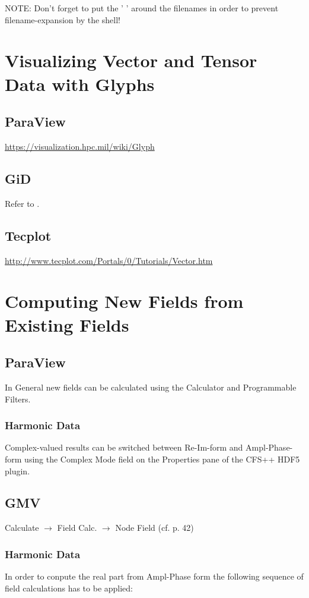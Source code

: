 NOTE: Don't  forget to put the  ' ' around  the filenames in order  to prevent
filename-expansion by the shell!


\section{Visualizing Vector and Tensor Data with Glyphs}

\subsection{ParaView}
\url{https://visualization.hpc.mil/wiki/Glyph}

\subsection{GiD}
Refer   to   \cite{Simkovics2010}.

\subsection{Tecplot}
\url{http://www.tecplot.com/Portals/0/Tutorials/Vector.htm}

\section{Computing New Fields from Existing Fields}

\subsection{ParaView}  In  General new  fields  can  be  calculated using  the
Calculator and Programmable Filters.

\subsubsection{Harmonic Data}  Complex-valued results can  be switched between
Re-Im-form and Ampl-Phase-form using the  Complex Mode field on the Properties
pane of the CFS++ HDF5 plugin.

\subsection{GMV}

Calculate    $\rightarrow$    Field    Calc.    $\rightarrow$    Node    Field
(cf. \cite{GMVManual2008} p. 42)

\subsubsection{Harmonic  Data}  In  order   to  conpute  the  real  part  from
Ampl-Phase  form  the following  sequence  of  field  calculations has  to  be
applied:

